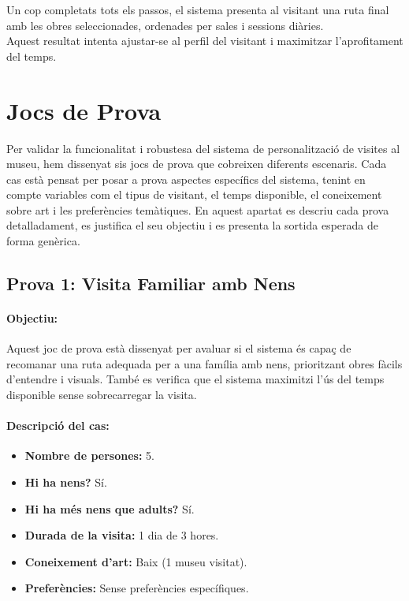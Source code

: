 \documentclass[a4paper]{article}
\begin{document}
	Un cop completats tots els passos, el sistema presenta al visitant una ruta final amb les obres seleccionades, ordenades per sales i sessions diàries. \\
	
	Aquest resultat intenta ajustar-se al perfil del visitant i maximitzar l’aprofitament del temps.
	
	
	\newpage
	\section{Jocs de Prova}
	
	Per validar la funcionalitat i robustesa del sistema de personalització de visites al museu, hem dissenyat sis jocs de prova que cobreixen diferents escenaris. Cada cas està pensat per posar a prova aspectes específics del sistema, tenint en compte variables com el tipus de visitant, el temps disponible, el coneixement sobre art i les preferències temàtiques. En aquest apartat es descriu cada prova detalladament, es justifica el seu objectiu i es presenta la sortida esperada de forma genèrica.
	
	\subsection{Prova 1: Visita Familiar amb Nens}
	
	\paragraph{Objectiu:} 
	Aquest joc de prova està dissenyat per avaluar si el sistema és capaç de recomanar una ruta adequada per a una família amb nens, prioritzant obres fàcils d’entendre i visuals. També es verifica que el sistema maximitzi l’ús del temps disponible sense sobrecarregar la visita.
	
	\paragraph{Descripció del cas:} 
	
	\begin{itemize}
		\item \textbf{Nombre de persones:} 5.
		\item \textbf{Hi ha nens?} Sí.
		\item \textbf{Hi ha més nens que adults?} Sí.
		\item \textbf{Durada de la visita:} 1 dia de 3 hores.
		\item \textbf{Coneixement d’art:} Baix (1 museu visitat).
		\item \textbf{Preferències:} Sense preferències específiques.
	\end{itemize}
	
\end{document}
